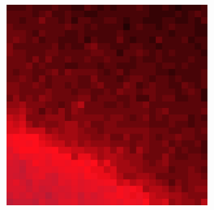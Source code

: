 \documentclass[10pt]{scrartcl}
\begin{document}
\begin{figure}[!ht]
\begin{subfigure}[b]{.3\linewidth}
    \end{subfigure}
    \begin{subfigure}[b]{.3\linewidth}
        \centering
        \includegraphics[width=1.2\linewidth]{../plots_tables_images/1d1dcrop_6_9.eps}
    \end{subfigure}
    \caption{}
    \label{lotsofcrop}
\end{figure}
\end{document}

